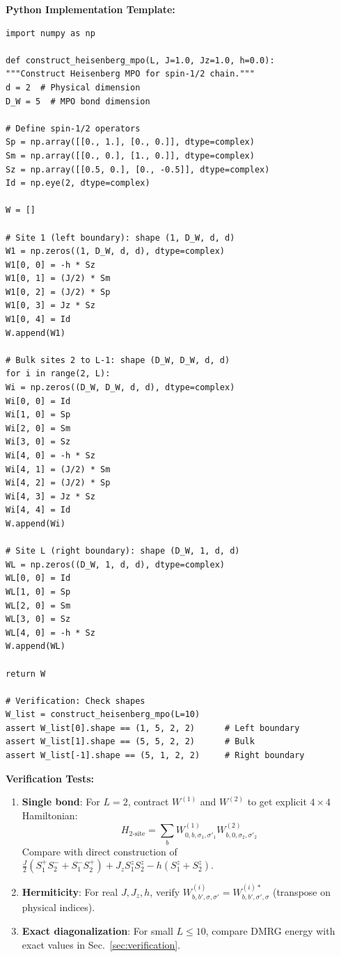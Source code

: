 \documentclass[aps,prb,onecolumn,scriptaddress]{revtex4-2}
\begin{document}
\textbf{Python Implementation Template:}
\begin{verbatim}
import numpy as np

def construct_heisenberg_mpo(L, J=1.0, Jz=1.0, h=0.0):
"""Construct Heisenberg MPO for spin-1/2 chain."""
d = 2  # Physical dimension
D_W = 5  # MPO bond dimension

# Define spin-1/2 operators
Sp = np.array([[0., 1.], [0., 0.]], dtype=complex)
Sm = np.array([[0., 0.], [1., 0.]], dtype=complex)
Sz = np.array([[0.5, 0.], [0., -0.5]], dtype=complex)
Id = np.eye(2, dtype=complex)

W = []

# Site 1 (left boundary): shape (1, D_W, d, d)
W1 = np.zeros((1, D_W, d, d), dtype=complex)
W1[0, 0] = -h * Sz
W1[0, 1] = (J/2) * Sm
W1[0, 2] = (J/2) * Sp
W1[0, 3] = Jz * Sz
W1[0, 4] = Id
W.append(W1)

# Bulk sites 2 to L-1: shape (D_W, D_W, d, d)
for i in range(2, L):
Wi = np.zeros((D_W, D_W, d, d), dtype=complex)
Wi[0, 0] = Id
Wi[1, 0] = Sp
Wi[2, 0] = Sm
Wi[3, 0] = Sz
Wi[4, 0] = -h * Sz
Wi[4, 1] = (J/2) * Sm
Wi[4, 2] = (J/2) * Sp
Wi[4, 3] = Jz * Sz
Wi[4, 4] = Id
W.append(Wi)

# Site L (right boundary): shape (D_W, 1, d, d)
WL = np.zeros((D_W, 1, d, d), dtype=complex)
WL[0, 0] = Id
WL[1, 0] = Sp
WL[2, 0] = Sm
WL[3, 0] = Sz
WL[4, 0] = -h * Sz
W.append(WL)

return W

# Verification: Check shapes
W_list = construct_heisenberg_mpo(L=10)
assert W_list[0].shape == (1, 5, 2, 2)      # Left boundary
assert W_list[1].shape == (5, 5, 2, 2)      # Bulk
assert W_list[-1].shape == (5, 1, 2, 2)     # Right boundary
\end{verbatim}

\textbf{Verification Tests:}
\begin{enumerate}
\item \textbf{Single bond}: For $L=2$, contract $W^{(1)}$ and $W^{(2)}$ to get explicit $4 \times 4$ Hamiltonian:
\begin{equation}
H_{2\text{-site}} = \sum_{b} W^{(1)}_{0,b,\sigma_1,\sigma'_1} W^{(2)}_{b,0,\sigma_2,\sigma'_2}
\end{equation}
Compare with direct construction of $\frac{J}{2}(S_1^+ S_2^- + S_1^- S_2^+) + J_z S_1^z S_2^z - h(S_1^z + S_2^z)$.

\item \textbf{Hermiticity}: For real $J, J_z, h$, verify $W^{(i)}_{b,b',\sigma,\sigma'} = W^{(i)*}_{b,b',\sigma',\sigma}$ (transpose on physical indices).

\item \textbf{Exact diagonalization}: For small $L \leq 10$, compare DMRG energy with exact values in Sec.~\ref{sec:verification}.
\end{enumerate}
\end{document}
